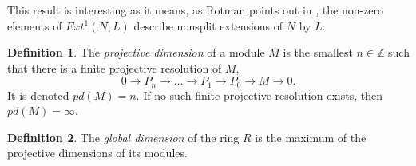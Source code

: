 \documentclass[11.5pt, twoside, a4paper, titlepage]{report}
\providecommand{\bb}[1]{\mathbb{#1}}
\theoremstyle{definition}
\newtheorem{mydef}{Definition}[section]
\theoremstyle{plain}
\begin{document}
This result is interesting as it means, as Rotman points out in \cite{Rotman}, the non-zero elements of $Ext^1(N,L)$ describe nonsplit extensions of $N$ by $L$.

\begin{mydef}
The \emph{projective dimension} of a module $M$ is the smallest $n\in \bb{Z}$ such that there is a finite projective resolution of $M$,
\begin{equation*}
0 \xrightarrow{} P_n \xrightarrow{} \dots \xrightarrow{} P_1 \xrightarrow{} P_0 \xrightarrow{} M \xrightarrow{} 0.
\end{equation*}
It is denoted $pd(M)=n$. If no such finite projective resolution exists, then $pd(M)=\infty$.
\end{mydef}

\begin{mydef}
The \emph{global dimension} of the ring $R$ is the maximum of the projective dimensions of its modules.
\end{mydef}
\end{document}
